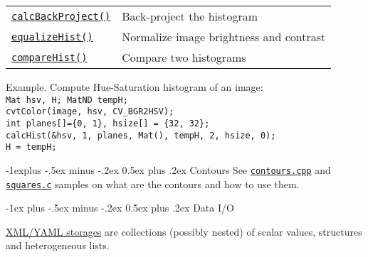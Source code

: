 \documentclass[10pt,landscape]{article}
\makeatletter
\renewcommand{\section}{\@startsection{section}{1}{0mm}%
                                {-1ex plus -.5ex minus -.2ex}%
                                {0.5ex plus .2ex}%
                                {\normalfont\large\bfseries}}
\renewcommand{\subsection}{\@startsection{subsection}{2}{0mm}%
                                {-1explus -.5ex minus -.2ex}%
                                {0.5ex plus .2ex}%
                                {\normalfont\normalsize\bfseries}}
\makeatother
\begin{document}
\begin{multicols}{3}
\begin{tabular}{@{}p{\the\MyLen}%
                @{}p{\linewidth-\the\MyLen}@{}}
\texttt{\href{http://opencv.willowgarage.com/documentation/cpp/histograms.html\#calcbackproject}{calcBackProject()}} & Back-project the histogram \\

\texttt{\href{http://opencv.willowgarage.com/documentation/cpp/histograms.html\#equalizehist}{equalizeHist()}} & Normalize image brightness and contrast\\

\texttt{\href{http://opencv.willowgarage.com/documentation/cpp/histograms.html\#comparehist}{compareHist()}} & Compare two histograms\\

\end{tabular}

\begin{tabbing}
Example. Compute Hue-Saturation histogram of an image:\\
\texttt{Mat hsv, H; MatND tempH;}\\
\texttt{cvtColor(image, hsv, CV\_BGR2HSV);}\\
\texttt{int planes[]=\{0, 1\}, hsize[] = \{32, 32\};}\\
\texttt{calcHist(\&hsv, 1, planes, Mat(), tempH, 2, hsize, 0);}\\
\texttt{H = tempH;}
\end{tabbing}

\subsection{Contours}
See \texttt{\href{https://code.ros.org/svn/opencv/trunk/opencv/samples/cpp/contours.cpp}{contours.cpp}} and \texttt{\href{https://code.ros.org/svn/opencv/trunk/opencv/samples/c/squares.c}{squares.c}}
samples on what are the contours and how to use them.

\section{Data I/O}

\href{http://opencv.willowgarage.com/documentation/cpp/xml_yaml_persistence.html\#filestorage}{XML/YAML storages} are collections (possibly nested) of scalar values, structures and heterogeneous lists.


\end{multicols}
\end{document}
